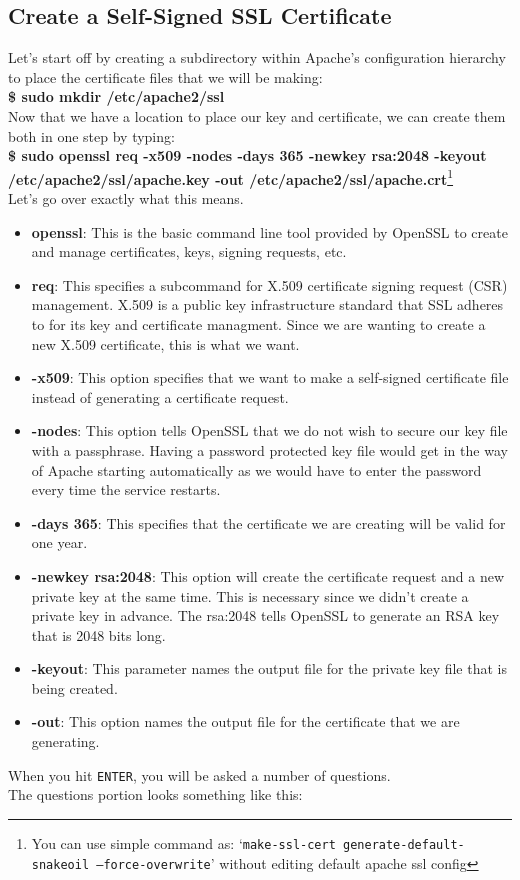 \documentclass[10pt,a4paper]{article}
\numberwithin{equation}{section}
\numberwithin{figure}{section}
\numberwithin{table}{section}
\begin{document}
	\subsection{Create a Self-Signed SSL Certificate}
	Let's start off by creating a subdirectory within Apache's configuration hierarchy to place the certificate files that we will be making:\\
	\textbf{\$ sudo mkdir /etc/apache2/ssl} \\
	Now that we have a location to place our key and certificate, we can create them both in one step by typing: \\
	\textbf{\$ sudo openssl req -x509 -nodes -days 365 -newkey rsa:2048 -keyout /etc/apache2/ssl/apache.key -out /etc/apache2/ssl/apache.crt}\footnote{You can use simple command as: `\texttt{make-ssl-cert generate-default-snakeoil --force-overwrite}' without editing default apache ssl config} \\
	Let's go over exactly what this means. \\
	\begin{itemize}
		\item \textbf{openssl}: This is the basic command line tool provided by OpenSSL to create and manage certificates, keys, signing requests, etc.
		\item \textbf{req}: This specifies a subcommand for X.509 certificate signing request (CSR) management. X.509 is a public key infrastructure standard that SSL adheres to for its key and certificate managment. Since we are wanting to create a new X.509 certificate, this is what we want.
		\item \textbf{-x509}: This option specifies that we want to make a self-signed certificate file instead of generating a certificate request.
		\item \textbf{-nodes}: This option tells OpenSSL that we do not wish to secure our key file with a passphrase. Having a password protected key file would get in the way of Apache starting automatically as we would have to enter the password every time the service restarts.
		\item \textbf{-days 365}: This specifies that the certificate we are creating will be valid for one year.
		\item \textbf{-newkey rsa:2048}: This option will create the certificate request and a new private key at the same time. This is necessary since we didn't create a private key in advance. The rsa:2048 tells OpenSSL to generate an RSA key that is 2048 bits long.
		\item \textbf{-keyout}: This parameter names the output file for the private key file that is being created.
		\item \textbf{-out}: This option names the output file for the certificate that we are generating.	
	\end{itemize}
	When you hit \texttt{ENTER}, you will be asked a number of questions. \\
	The questions portion looks something like this: \\
	
\end{document}
